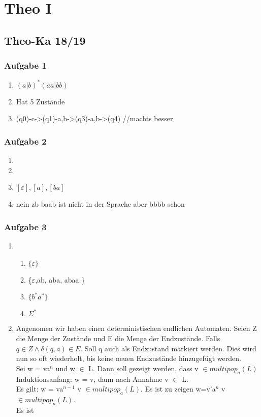 \documentclass[12pt]{scrartcl}
\begin{document}
	
\section{Theo I}

\subsection{Theo-Ka 18/19}

\subsubsection{Aufgabe 1}
	\begin{enumerate}
		\item \( (a|b)^{*}(aa|bb) \)
		\item Hat 5 Zustände
		\item (q0)-c->(q1)-a,b->(q3)-a,b->(q4) //machts besser
	\end{enumerate}
	
\subsubsection{Aufgabe 2}
	\begin{enumerate}
		\item
		\item
		\item \( [\varepsilon], [a], [ba] \)
		\item nein zb baab ist nicht in der Sprache aber bbbb schon
	\end{enumerate}
	
\subsubsection{Aufgabe 3}
	\begin{enumerate}
		\item 
		\begin{enumerate}
			\item \(\{\varepsilon\}\)
			\item \{$\varepsilon$,ab, aba, abaa \}
			\item \(\{ b^{*}a^{*}\}\)
			\item \( \Sigma^{*}\)
		\end{enumerate}
		\item Angenomen wir haben einen deterministischen endlichen Automaten. Seien Z die Menge der Zustände und E die Menge der Endzustände. Falls \( q \in Z \land \delta(q,a) \in E  \). Soll q auch als Endzustand markiert werden. Dies wird nun so oft wiederholt, bis keine neuen Endzustände hinzugefügt werden.\\
		Sei w = va$^{n}$ und w $\in$ L.  Dann soll gezeigt werden, dass v \(\in multipop_a(L)\)  \\ 
		
		Induktionsanfang: w = v, dann nach Annahme v $\in$ L.\\
		Es gilt: w = va$^{n-1}$ v \(\in multipop_a(L)\). Es ist zu zeigen w=v'a$^{n}$ v \(\in multipop_a(L)\). \\ 
		Es ist 
		
		
	\end{enumerate}
\end{document}
